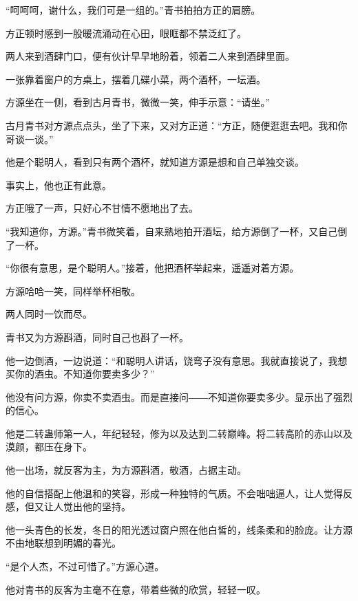 \begin{this_body}
“呵呵呵，谢什么，我们可是一组的。”青书拍拍方正的肩膀。

方正顿时感到一股暖流涌动在心田，眼眶都不禁泛红了。

两人来到酒肆门口，便有伙计早早地盼着，领着二人来到酒肆里面。

一张靠着窗户的方桌上，摆着几碟小菜，两个酒杯，一坛酒。

方源坐在一侧，看到古月青书，微微一笑，伸手示意：“请坐。”

古月青书对方源点点头，坐了下来，又对方正道：“方正，随便逛逛去吧。我和你哥谈一谈。”

他是个聪明人，看到只有两个酒杯，就知道方源是想和自己单独交谈。

事实上，他也正有此意。

方正哦了一声，只好心不甘情不愿地出了去。

“我知道你，方源。”青书微笑着，自来熟地拍开酒坛，给方源倒了一杯，又自己倒了一杯。

“你很有意思，是个聪明人。”接着，他把酒杯举起来，遥遥对着方源。

方源哈哈一笑，同样举杯相敬。

两人同时一饮而尽。

青书又为方源斟酒，同时自己也斟了一杯。

他一边倒酒，一边说道：“和聪明人讲话，饶弯子没有意思。我就直接说了，我想买你的酒虫。不知道你要卖多少？”

他没有问方源，你卖不卖酒虫。而是直接问――不知道你要卖多少。显示出了强烈的信心。

他是二转蛊师第一人，年纪轻轻，修为以及达到二转巅峰。将二转高阶的赤山以及漠颜，都压在身下。

他一出场，就反客为主，为方源斟酒，敬酒，占据主动。

他的自信搭配上他温和的笑容，形成一种独特的气质。不会咄咄逼人，让人觉得反感，但又让人觉出他的坚持。

他一头青色的长发，冬日的阳光透过窗户照在他白皙的，线条柔和的脸庞。让方源不由地联想到明媚的春光。

“是个人杰，不过可惜了。”方源心道。

他对青书的反客为主毫不在意，带着些微的欣赏，轻轻一叹。

\end{this_body}

